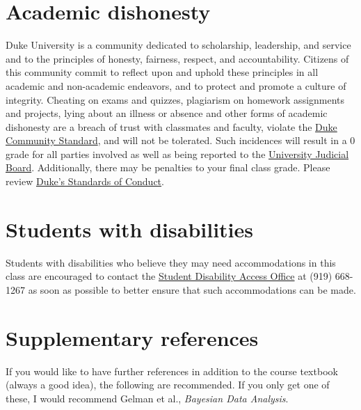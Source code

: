 \documentclass[12pt]{article}
\begin{document}


\section{Academic dishonesty}

Duke University is a community dedicated to scholarship, leadership, and service and to the principles of honesty, fairness, respect, and accountability. Citizens of this community commit to reflect upon and uphold these principles in all academic and non-academic endeavors, and to protect and promote a culture of integrity. Cheating on exams and quizzes, plagiarism on homework assignments and projects, lying about an illness or absence and other forms of academic dishonesty are a breach of trust with classmates and faculty, violate the \href{https://gradschool.duke.edu/academics/academic-policies-and-forms/standards-conduct/duke-community-standard}{Duke Community Standard}, and will not be tolerated. Such incidences will result in a 0 grade for all parties involved as well as being reported to the \href{https://gradschool.duke.edu/academics/academic-policies-and-forms/standards-conduct/judicial-code-and-procedures}{University Judicial Board}. Additionally, there may be penalties to your final class grade. Please review \href{https://gradschool.duke.edu/academics/academic-policies-and-forms/standards-conduct}{Duke's Standards of Conduct}.

\section{Students with disabilities}

Students with disabilities who believe they may need accommodations in this class are encouraged to contact the \href{http://access.duke.edu/students/requesting/index.php}{Student Disability Access Office} at (919) 668-1267 as soon as possible to better ensure that such accommodations can be made.

\iffalse

\section{Supplementary references}

If you would like to have further references in addition to the course textbook (always a good idea), the following are recommended. If you only get one of these, I would recommend Gelman et al., \textit{Bayesian Data Analysis}.
\end{document}

